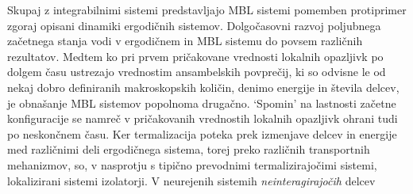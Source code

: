 Skupaj z integrabilnimi sistemi predstavljajo MBL sistemi pomemben protiprimer
zgoraj opisani dinamiki ergodičnih sistemov. Dolgočasovni razvoj poljubnega začetnega stanja vodi v ergodičnem in MBL sistemu do povsem različnih rezultatov. Medtem ko pri prvem pričakovane vrednosti lokalnih opazljivk po dolgem času ustrezajo vrednostim ansambelskih povprečij, ki so odvisne le od nekaj dobro definiranih makroskopskih količin, denimo energije in števila delcev, je obnašanje MBL sistemov popolnoma drugačno. `Spomin' na lastnosti začetne konfiguracije se namreč v pričakovanih vrednostih lokalnih opazljivk ohrani tudi po 
neskončnem času. Ker termalizacija poteka prek izmenjave delcev in energije med različnimi deli ergodičnega
sistema, torej preko različnih transportnih mehanizmov, so, v nasprotju s tipično prevodnimi termalizirajočimi sistemi, lokalizirani sistemi izolatorji. V neurejenih sistemih \emph{neinteragirajočih} delcev 

